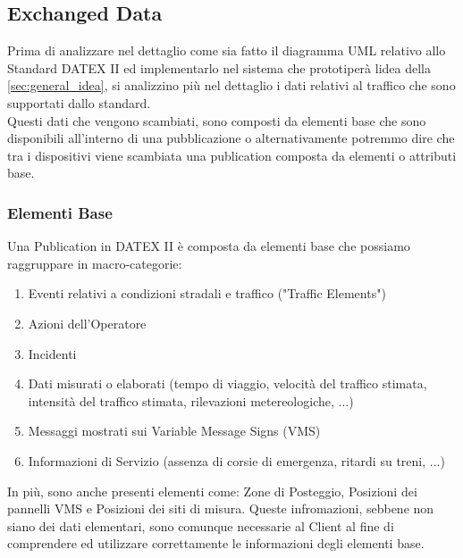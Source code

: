 \subsection{Exchanged Data}
Prima di analizzare nel dettaglio come sia fatto il diagramma UML relativo allo Standard DATEX II ed implementarlo nel sistema che prototiperà lidea della \autoref{sec:general_idea}, si analizzino più nel dettaglio i dati relativi al traffico che sono supportati dallo standard.\\
Questi dati che vengono scambiati, sono composti da elementi base che sono disponibili all'interno di una pubblicazione o alternativamente potremmo dire che tra i dispositivi viene scambiata una publication composta da elementi o attributi base.

\subsubsection{Elementi Base}
Una Publication in DATEX II è composta da elementi base che possiamo raggruppare in macro-categorie: 
\begin{enumerate}
	\item Eventi relativi a condizioni stradali e traffico ("Traffic Elements")
	\item Azioni dell'Operatore
	\item Incidenti
	\item Dati misurati o elaborati (tempo di viaggio, velocità del traffico stimata, intensità del traffico stimata, rilevazioni metereologiche, ...)
	\item Messaggi mostrati sui Variable Message Signs (VMS)
	\item Informazioni di Servizio (assenza di corsie di emergenza, ritardi su treni, ...)
\end{enumerate}
In più, sono anche presenti elementi come: Zone di Posteggio, Posizioni dei pannelli VMS e Posizioni dei siti di misura. 
Queste infromazioni, sebbene non siano dei dati elementari, sono comunque necessarie al Client al fine di comprendere ed utilizzare correttamente le informazioni degli elementi base.


